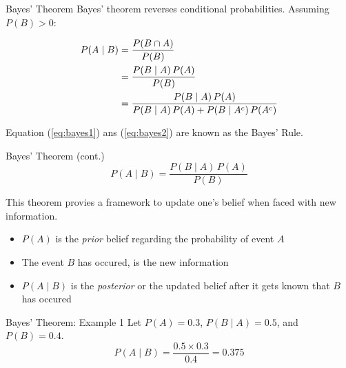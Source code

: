 \documentclass[12pt, aspectratio=169]{beamer}
\begin{document}
	\begin{frame}{Bayes' Theorem}
		Bayes' theorem reverses conditional probabilities. Assuming $P(B) > 0$:

		\begin{align}
			P(A \mid B) &= \frac{P(B \cap A)}{P(B)} \notag \\ 
						&= \frac{P(B \mid A)\,P(A)}{P(B)} \label{eq:bayes1}\\
						&= \frac{P(B \mid A)\,P(A)}{P(B \mid A)\,P(A) + P(B \mid A^c)\,P(A^c)} \label{eq:bayes2}
		\end{align}

		Equation (\ref{eq:bayes1}) ans (\ref{eq:bayes2}) are known as the Bayes' Rule.



	\end{frame}


	\begin{frame}{Bayes' Theorem (cont.)}
		\[
			P(A \mid B) = \frac{P(B \mid A)\,P(A)}{P(B)}
		\]

		\vspace{0.5em}

		This theorem provies a framework to update one's belief when faced with new information.

		\vspace{0.5em}

		\begin{itemize}
			\item $P(A)$ is the \emph{prior} belief regarding the probability of event $A$
			\item The event $B$ has occured, is the new information
			\item $P(A \mid B)$ is the \emph{posterior} or the updated belief after it gets known that $B$ has occured
		\end{itemize}
	\end{frame}


	\begin{frame}{Bayes' Theorem: Example 1}
		Let \(P(A) = 0.3\), \(P(B \mid A) = 0.5\), and \(P(B) = 0.4\).
		\[
			P(A \mid B) = \frac{0.5 \times 0.3}{0.4} = 0.375
		\]
	\end{frame}
\end{document}
